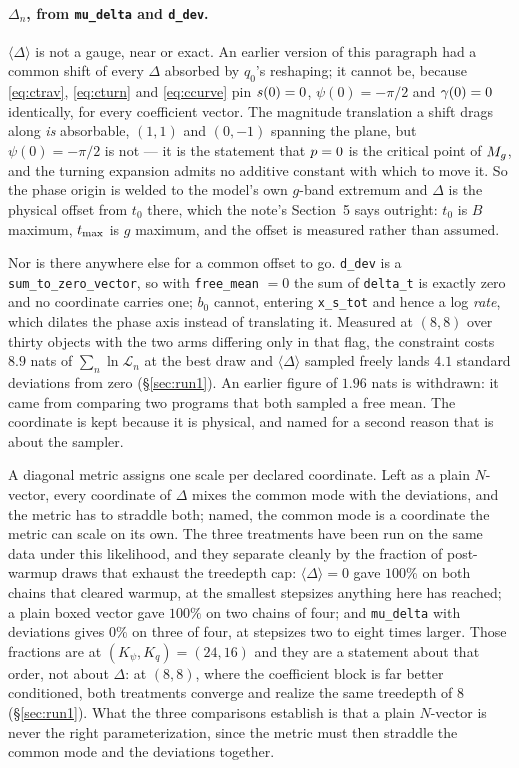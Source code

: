 \documentclass[11pt]{article}
\newcommand{\code}[1]{\texttt{#1}}
\begin{document}
\paragraph{$\Delta_{n}$, from \code{mu\_delta} and \code{d\_dev}.}
$\langle\Delta\rangle$ is not a gauge, near or exact. An earlier version of this
paragraph had a common shift of every $\Delta$ absorbed by $q_{0}$'s reshaping; it cannot
be, because \eqref{eq:ctrav}, \eqref{eq:cturn} and \eqref{eq:ccurve} pin
$s(0) = 0$, $\psi(0) = -\pi/2$ and $\gamma(0) = 0$ identically, for every
coefficient vector. The magnitude translation a shift drags along \emph{is} absorbable,
$(1,1)$ and $(0,-1)$ spanning the plane, but $\psi(0) = -\pi/2$ is not --- it is the
statement that $p = 0$ is the critical point of $M_{g}$, and the turning expansion
admits no additive constant with which to move it. So the phase origin is welded to the
model's own $g$-band extremum and $\Delta$ is the physical offset from $t_{0}$ there, which
the note's Section~5 says outright: $t_{0}$ is $B$ maximum, $t_{\mathrm{max}}$ is $g$ maximum, and the
offset is measured rather than assumed.

Nor is there anywhere else for a common offset to go. \code{d\_dev} is a
\code{sum\_to\_zero\_vector}, so with \code{free\_mean} $= 0$ the sum of \code{delta\_t}
is exactly zero and no coordinate carries one; $b_{0}$ cannot, entering \code{x\_s\_tot}
and hence a log \emph{rate}, which dilates the phase axis instead of translating it.
Measured at $(8,8)$ over thirty objects with the two arms differing only in that flag, the
constraint costs $8.9$ nats of $\sum_{n}\ln\mathcal{L}_{n}$ at the best draw and
$\langle\Delta\rangle$ sampled freely lands $4.1$ standard deviations from zero
(\S\ref{sec:run1}). An earlier figure of $1.96$ nats is withdrawn: it came from comparing
two programs that both sampled a free mean. The coordinate is kept because it is physical,
and named for a second reason that is about the sampler.

A diagonal metric assigns one scale per declared coordinate. Left as a plain
$N$-vector, every coordinate of $\Delta$ mixes the common mode with the deviations, and the
metric has to straddle both; named, the common mode is a coordinate the metric can scale on
its own. The three treatments have been run on the same data under this likelihood, and
they separate cleanly by the fraction of post-warmup draws that exhaust the treedepth cap:
$\langle\Delta\rangle = 0$ gave $100\%$ on both chains that cleared warmup, at the smallest
stepsizes anything here has reached; a plain boxed vector gave $100\%$ on two chains of
four; and \code{mu\_delta} with deviations gives $0\%$ on three of four, at stepsizes two to
eight times larger. Those fractions are at $(K_{\psi}, K_{q}) = (24, 16)$ and they are a
statement about that order, not about $\Delta$: at $(8,8)$, where the coefficient block is
far better conditioned, both treatments converge and realize the same treedepth of $8$
(\S\ref{sec:run1}). What the three comparisons establish is that a plain $N$-vector is
never the right parameterization, since the metric must then straddle the common mode and
the deviations together.
\end{document}
